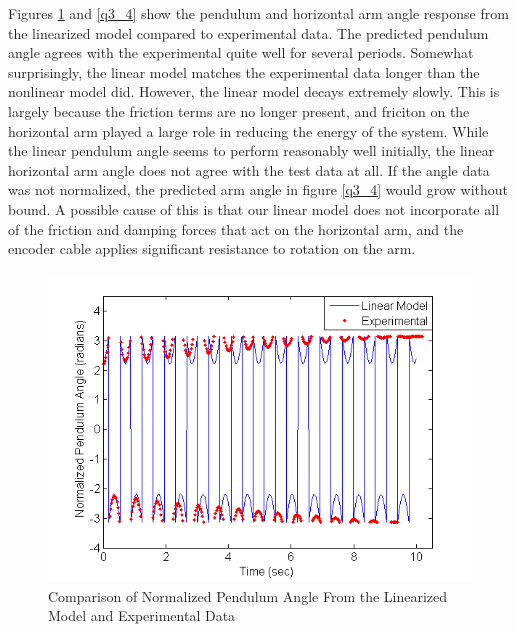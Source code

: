 \documentclass{article}
\theoremstyle{plain}
\theoremstyle{definition}
\theoremstyle{remark}
\begin{document}
Figures \ref{q3_3} and \ref{q3_4} show the pendulum and horizontal arm angle response from the linearized model compared to experimental data. The predicted pendulum angle agrees with the experimental quite well for several periods. Somewhat surprisingly, the linear model matches the experimental data longer than the nonlinear model did. However, the linear model decays extremely slowly. This is largely because the friction terms are no longer present, and friciton on the horizontal arm played a large role in reducing the energy of the system. While the linear pendulum angle seems to perform reasonably well initially, the linear horizontal arm angle does not agree with the test data at all. If the angle data was not normalized, the predicted arm angle in figure \ref{q3_4} would grow without bound. A possible cause of this is that our linear model does not incorporate all of the friction and damping forces that act on the horizontal arm, and the encoder cable applies significant resistance to rotation on the arm.\\

\begin{figure}[hbt]
\begin{center}
\includegraphics[width = 13cm]{alphaLinear.png}
\end{center}
\caption{Comparison of Normalized Pendulum Angle From the Linearized Model and Experimental Data}
\label{q3_3}
\end{figure}
\end{document}
